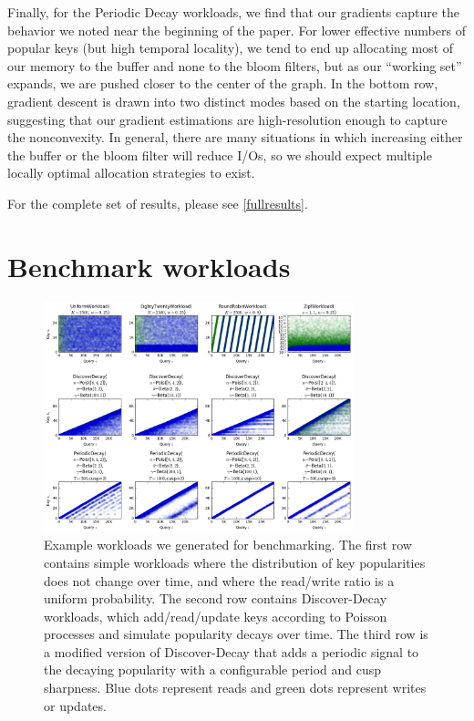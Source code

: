 \documentclass{cidr-2019}
\begin{document}
Finally, for the Periodic Decay workloads, we find that our gradients
capture the behavior we noted near the beginning of the paper. For lower
effective numbers of popular keys (but high temporal locality), we tend
to end up allocating most of our memory to the buffer and none to the bloom
filters, but as our ``working set'' expands, we are pushed closer to the center
of the graph. In the bottom row, gradient descent is drawn into two distinct
modes based on the starting location, suggesting that our gradient estimations
are high-resolution enough to capture the nonconvexity. In general, there are
many situations in which increasing either the buffer or the bloom filter will
reduce I/Os, so we should expect multiple locally optimal allocation strategies
to exist.

For the complete set of results, please see \ref{fullresults}.

\clearpage


\clearpage

\appendix

\section{Benchmark workloads} \label{workloads}

\begin{figure}[!h]
\centering
\includegraphics[width=0.80\textwidth]{workloads.png}
\caption{Example workloads we generated for benchmarking. The first row
  contains simple workloads where the distribution of key popularities does not
  change over time, and where the read/write ratio is a uniform probability.
  The second row contains Discover-Decay workloads, which add/read/update keys
  according to Poisson processes and simulate popularity decays over time. The
  third row is a modified version of Discover-Decay that adds a periodic signal
  to the decaying popularity with a configurable period and cusp sharpness. Blue
  dots represent reads and green dots represent writes or updates.}
\label{fig:workloads}
\end{figure}
\end{document}
